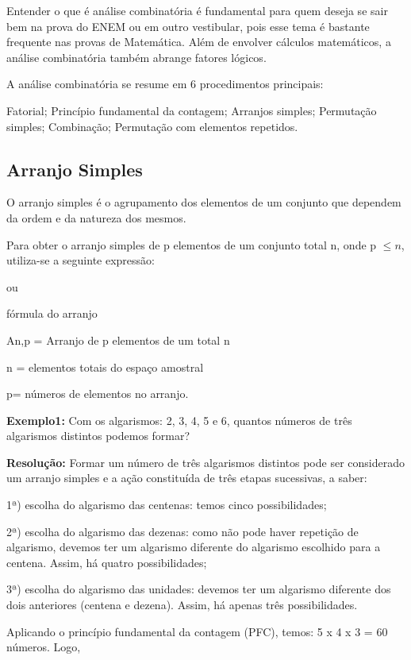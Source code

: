 \begin{multicols*}{2}
	Entender o que é análise combinatória é fundamental para quem deseja se sair bem na prova do ENEM ou em outro vestibular, pois esse tema é bastante frequente nas provas de Matemática. Além de envolver cálculos matemáticos, a análise combinatória também abrange fatores lógicos.

	A análise combinatória se resume em 6 procedimentos principais:

	Fatorial;
	Princípio fundamental da contagem;
	Arranjos simples;
	Permutação simples;
	Combinação;
	Permutação com elementos repetidos.

	\subsection{Arranjo Simples}

	O arranjo simples é o agrupamento dos elementos de um conjunto que dependem da ordem e da natureza dos mesmos.

	Para obter o arranjo simples de p elementos de um conjunto total  n, onde p $\leq n$, utiliza-se a seguinte expressão:

	 ou 

	fórmula do arranjo

	An,p = Arranjo de p elementos de um total n

	n = elementos totais do espaço amostral

	p= números de elementos no arranjo.

	\textbf{Exemplo1:} Com os algarismos: 2, 3, 4, 5 e 6, quantos números de três algarismos distintos podemos formar?

	\textbf{Resolução:} Formar um número de três algarismos distintos pode ser considerado um arranjo simples e a ação constituída de três etapas sucessivas, a saber:

	1ª) escolha do algarismo das centenas: temos cinco possibilidades;

	2ª) escolha do algarismo das dezenas: como não pode haver repetição de algarismo, devemos ter um algarismo diferente do algarismo escolhido para a centena. Assim, há quatro possibilidades;

	3ª) escolha do algarismo das unidades: devemos ter um algarismo diferente dos dois anteriores (centena e dezena). Assim, há apenas três possibilidades.

	Aplicando o princípio fundamental da contagem (PFC), temos: 5 x 4 x 3 = 60 números. Logo,


\end{multicols*}
